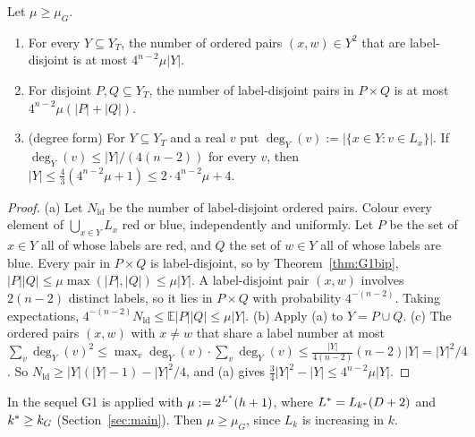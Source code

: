 \begin{corollary}\label{cor:G1}
Let $\mu\ge\mu_G$.
\begin{enumerate}[label=(\alph*)]
\item For every $Y\subseteq Y_T$, the number of ordered pairs $(x,w)\in Y^2$ that are label-disjoint is at most
  $4^{n-2}\mu|Y|$.
\item For disjoint $P,Q\subseteq Y_T$, the number of label-disjoint pairs in $P\times Q$ is at most
  $4^{n-2}\mu(|P|+|Q|)$.
\item (degree form) For $Y\subseteq Y_T$ and a real $v$ put $\deg_Y(v):=|\{x\in Y:v\in L_x\}|$. If
  $\deg_Y(v)\le|Y|/(4(n-2))$ for every $v$, then $|Y|\le\frac43(4^{n-2}\mu+1)\le2\cdot4^{n-2}\mu+4$.
\end{enumerate}
\end{corollary}
\begin{proof}
(a) Let $N_{\mathrm{ld}}$ be the number of label-disjoint ordered pairs. Colour every element of
$\bigcup_{x\in Y}L_x$ red or blue, independently and uniformly. Let $P$ be the set of $x\in Y$ all of whose labels
are red, and $Q$ the set of $w\in Y$ all of whose labels are blue. Every pair in $P\times Q$ is label-disjoint, so
by Theorem~\ref{thm:G1bip}, $|P||Q|\le\mu\max(|P|,|Q|)\le\mu|Y|$. A label-disjoint pair $(x,w)$ involves
$2(n-2)$ distinct labels, so it lies in $P\times Q$ with probability $4^{-(n-2)}$. Taking expectations,
$4^{-(n-2)}N_{\mathrm{ld}}\le\mathbb E|P||Q|\le\mu|Y|$.
(b) Apply (a) to $Y=P\cup Q$.
(c) The ordered pairs $(x,w)$ with $x\ne w$ that share a label number at most
$\sum_v\deg_Y(v)^2\le\max_v\deg_Y(v)\cdot\sum_v\deg_Y(v)\le\frac{|Y|}{4(n-2)}(n-2)|Y|=|Y|^2/4$. So
$N_{\mathrm{ld}}\ge|Y|(|Y|-1)-|Y|^2/4$, and (a) gives $\frac34|Y|^2-|Y|\le4^{n-2}\mu|Y|$.
\end{proof}

In the sequel G1 is applied with $\mu:=2^{L^{\ast}}(h+1)$, where $L^{\ast}=L_{k^{\ast}}(D+2)$ and $k^{\ast}\ge k_G$
(Section~\ref{sec:main}). Then $\mu\ge\mu_G$, since $L_k$ is increasing in $k$.
